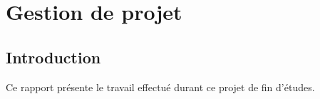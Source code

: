 \chapter{Gestion de projet}
	
	\section{Introduction}
		Ce rapport présente le travail effectué durant ce projet de fin d'études.

	